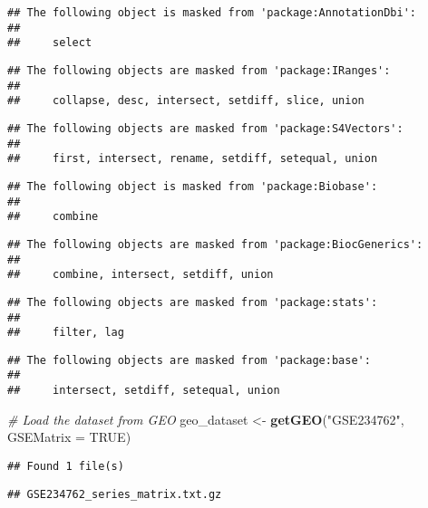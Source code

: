 \documentclass[
]{article}
\newenvironment{Shaded}{\begin{snugshade}}{\end{snugshade}}
\newcommand{\AttributeTok}[1]{\textcolor[rgb]{0.13,0.29,0.53}{#1}}
\newcommand{\CommentTok}[1]{\textcolor[rgb]{0.56,0.35,0.01}{\textit{#1}}}
\newcommand{\ConstantTok}[1]{\textcolor[rgb]{0.56,0.35,0.01}{#1}}
\newcommand{\FunctionTok}[1]{\textcolor[rgb]{0.13,0.29,0.53}{\textbf{#1}}}
\newcommand{\NormalTok}[1]{#1}
\newcommand{\OtherTok}[1]{\textcolor[rgb]{0.56,0.35,0.01}{#1}}
\newcommand{\StringTok}[1]{\textcolor[rgb]{0.31,0.60,0.02}{#1}}
\begin{document}
\begin{verbatim}
## The following object is masked from 'package:AnnotationDbi':
## 
##     select
\end{verbatim}

\begin{verbatim}
## The following objects are masked from 'package:IRanges':
## 
##     collapse, desc, intersect, setdiff, slice, union
\end{verbatim}

\begin{verbatim}
## The following objects are masked from 'package:S4Vectors':
## 
##     first, intersect, rename, setdiff, setequal, union
\end{verbatim}

\begin{verbatim}
## The following object is masked from 'package:Biobase':
## 
##     combine
\end{verbatim}

\begin{verbatim}
## The following objects are masked from 'package:BiocGenerics':
## 
##     combine, intersect, setdiff, union
\end{verbatim}

\begin{verbatim}
## The following objects are masked from 'package:stats':
## 
##     filter, lag
\end{verbatim}

\begin{verbatim}
## The following objects are masked from 'package:base':
## 
##     intersect, setdiff, setequal, union
\end{verbatim}

\begin{Shaded}
\begin{Highlighting}[]
\CommentTok{\# Load the dataset from GEO}
\NormalTok{geo\_dataset }\OtherTok{\textless{}{-}} \FunctionTok{getGEO}\NormalTok{(}\StringTok{"GSE234762"}\NormalTok{, }\AttributeTok{GSEMatrix =} \ConstantTok{TRUE}\NormalTok{)}
\end{Highlighting}
\end{Shaded}

\begin{verbatim}
## Found 1 file(s)
\end{verbatim}

\begin{verbatim}
## GSE234762_series_matrix.txt.gz
\end{verbatim}
\end{document}
